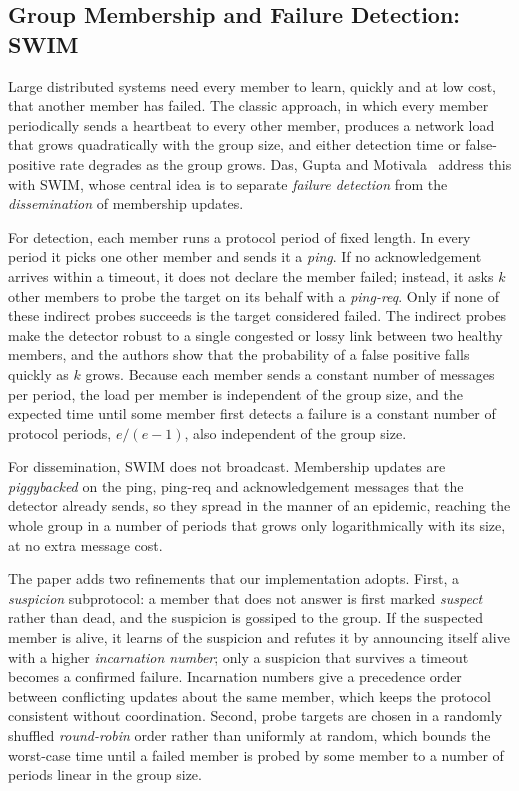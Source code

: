 \subsection{Group Membership and Failure Detection: SWIM}
Large distributed systems need every member to learn, quickly and at low cost, that another member has failed. The classic approach, in which every member periodically sends a heartbeat to every other member, produces a network load that grows quadratically with the group size, and either detection time or false-positive rate degrades as the group grows. Das, Gupta and Motivala~\cite{das2002swim} address this with SWIM, whose central idea is to separate \emph{failure detection} from the \emph{dissemination} of membership updates.

For detection, each member runs a protocol period of fixed length. In every period it picks one other member and sends it a \textit{ping}. If no acknowledgement arrives within a timeout, it does not declare the member failed; instead, it asks $k$ other members to probe the target on its behalf with a \textit{ping-req}. Only if none of these indirect probes succeeds is the target considered failed. The indirect probes make the detector robust to a single congested or lossy link between two healthy members, and the authors show that the probability of a false positive falls quickly as $k$ grows. Because each member sends a constant number of messages per period, the load per member is independent of the group size, and the expected time until some member first detects a failure is a constant number of protocol periods, $e/(e-1)$, also independent of the group size.

For dissemination, SWIM does not broadcast. Membership updates are \emph{piggybacked} on the ping, ping-req and acknowledgement messages that the detector already sends, so they spread in the manner of an epidemic, reaching the whole group in a number of periods that grows only logarithmically with its size, at no extra message cost.

The paper adds two refinements that our implementation adopts. First, a \emph{suspicion} subprotocol: a member that does not answer is first marked \textit{suspect} rather than dead, and the suspicion is gossiped to the group. If the suspected member is alive, it learns of the suspicion and refutes it by announcing itself alive with a higher \emph{incarnation number}; only a suspicion that survives a timeout becomes a confirmed failure. Incarnation numbers give a precedence order between conflicting updates about the same member, which keeps the protocol consistent without coordination. Second, probe targets are chosen in a randomly shuffled \emph{round-robin} order rather than uniformly at random, which bounds the worst-case time until a failed member is probed by some member to a number of periods linear in the group size.

